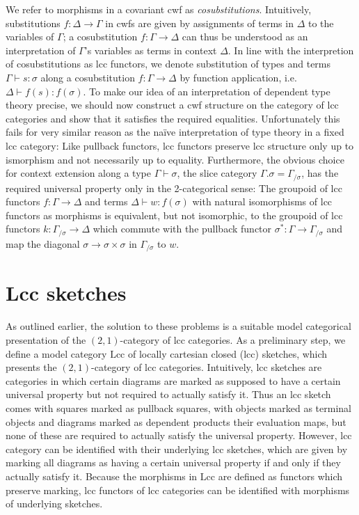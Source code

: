 \documentclass{article}
\theoremstyle{remark}
\theoremstyle{definition}
\begin{document}
We refer to morphisms in a covariant cwf as \emph{cosubstitutions}.
Intuitively, substitutions $f : \Delta \rightarrow \Gamma$ in cwfs are given by assignments of terms in $\Delta$ to the variables of $\Gamma$; a cosubstitution $f : \Gamma \rightarrow \Delta$ can thus be understood as an interpretation of $\Gamma$'s variables as terms in context $\Delta$.
In line with the interpretion of cosubstitutions as lcc functors, we denote substitution of types and terms $\Gamma \vdash s : \sigma$ along a cosubstitution $f : \Gamma \rightarrow \Delta$ by function application, i.e.\@ $\Delta \vdash f(s) : f(\sigma)$.
To make our idea of an interpretation of dependent type theory precise, we should now construct a cwf structure on the category of lcc categories and show that it satisfies the required equalities.
Unfortunately this fails for very similar reason as the naïve interpretation of type theory in a fixed lcc category:
Like pullback functors, lcc functors preserve lcc structure only up to ismorphism and not necessarily up to equality.
Furthermore, the obvious choice for context extension along a type $\Gamma \vdash \sigma$, the slice category $\Gamma.\sigma = \Gamma_{/ \sigma}$, has the required universal property only in the 2-categorical sense:
The groupoid of lcc functors $f : \Gamma \rightarrow \Delta$ and terms $\Delta \vdash w : f(\sigma)$ with natural isomorphisms of lcc functors as morphisms is equivalent, but not isomorphic, to the groupoid of lcc functors $k : \Gamma_{/ \sigma} \rightarrow \Delta$ which commute with the pullback functor $\sigma^* : \Gamma \rightarrow \Gamma_{/ \sigma}$ and map the diagonal $\sigma \rightarrow \sigma \times \sigma$ in $\Gamma_{/ \sigma}$ to $w$.

\section{Lcc sketches}
\label{sec:lcc-sketches}

As outlined earlier, the solution to these problems is a suitable model categorical presentation of the $(2, 1)$-category of lcc categories.
As a preliminary step, we define a model category $\mathrm{Lcc}$ of locally cartesian closed (lcc) sketches, which presents the $(2, 1)$-category of lcc categories.
Intuitively, lcc sketches are categories in which certain diagrams are marked as supposed to have a certain universal property but not required to actually satisfy it.
Thus an lcc sketch comes with squares marked as pullback squares, with objects marked as terminal objects and diagrams marked as dependent products their evaluation maps, but none of these are required to actually satisfy the universal property.
However, lcc category can be identified with their underlying lcc sketches, which are given by marking all diagrams as having a certain universal property if and only if they actually satisfy it.
Because the morphisms in $\mathrm{Lcc}$ are defined as functors which preserve marking, lcc functors of lcc categories can be identified with morphisms of underlying sketches.
\end{document}
